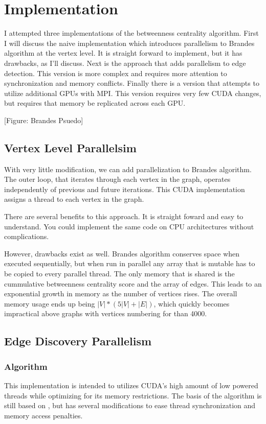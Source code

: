 \documentclass[10pt,twocolumn]{article}
\begin{document}
\section{Implementation}
I attempted three implementations of the betweenness centrality algorithm. First I will discuss the naive implementation which introduces parallelism to Brandes algorithm at the vertex level. It is straight forward to implement, but it has drawbacks, as I'll discuss. Next is the approach that adds parallelism to edge detection. This version is more complex and requires more attention to synchronization and memory conflicts. Finally there is a version that attempts to utilize additional GPUs with MPI. This version requires very few CUDA changes, but requires that memory be replicated across each GPU.
 
[Figure: Brandes Psuedo]
 
\subsection{Vertex Level Parallelsim}
\label{vertexPar}
With very little modification, we can add parallelization to Brandes algorithm. The outer loop, that iterates through each vertex in the graph, operates independently of previous and future iterations. This CUDA implementation assigns a thread to each vertex in the graph.
 
There are several benefits to this approach. It is straight foward and easy to understand. You could implement the same code on CPU architectures without complications.
 
However, drawbacks exist as well. Brandes algorithm conserves space when executed sequentially, but when run in parallel any array that is mutable has to be copied to every parallel thread. The only memory that is shared is the cummulative betweenness centrality score and the array of edges. This leads to an exponential growth in memory as the number of vertices rises. The overall memory usage ends up being $|V| * (5|V| + |E|)$, which quickly becomes impractical above graphs with vertices numbering for than 4000.
 
\subsection{Edge Discovery Parallelism}
\subsubsection{Algorithm}
\label{implBFS}
This implementation is intended to utilizes CUDA's high amount of low powered threads while optimizing for its memory restrictions. The basis of the algorithm is still based on \cite{Brandes01afaster}, but has several modifications to ease thread synchronization and memory access penalties.
 
\end{document}
